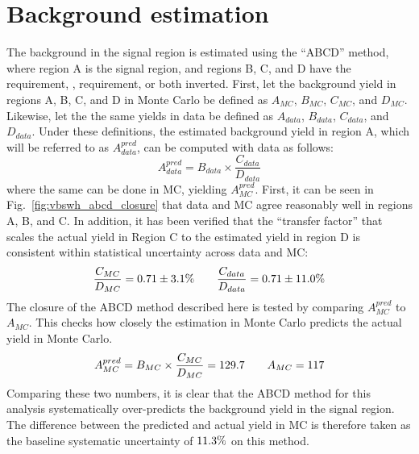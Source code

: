 \section{Background estimation}
The background in the signal region is estimated using the ``ABCD'' method, where region A is the signal region, and regions B, C, and D have the \detajj requirement, \MSD, requirement, or both inverted. %
First, let the background yield in regions A, B, C, and D in Monte Carlo be defined as $A_{MC}$, $B_{MC}$, $C_{MC}$, and $D_{MC}$.
Likewise, let the the same yields in data be defined as  $A_{data}$, $B_{data}$, $C_{data}$, and $D_{data}$.
Under these definitions, the estimated background yield in region A, which will be referred to as $A_{data}^{pred}$, can be computed with data as follows:
\begin{equation}\label{eq:abcd}
    A_{data}^{pred} = B_{data}\times\frac{C_{data}}{D_{data}}
\end{equation}
\noindent where the same can be done in MC, yielding $A_{MC}^{pred}$. 
First, it can be seen in Fig.~\ref{fig:vbswh_abcd_closure} that data and MC agree reasonably well in regions A, B, and C. 
In addition, it has been verified that the ``transfer factor'' that scales the actual yield in Region C to the estimated yield in region D is consistent within statistical uncertainty across data and MC:
\begin{equation*}
    \frac{C_{MC}}{D_{MC}} = 0.71 \pm 3.1\% \qquad \frac{C_{data}}{D_{data}} = 0.71 \pm 11.0\%
\end{equation*}
The closure of the ABCD method described here is tested by comparing $A_{MC}^{pred}$ to $A_{MC}$. 
This checks how closely the estimation in Monte Carlo predicts the actual yield in Monte Carlo. 
\begin{equation*}
    A_{MC}^{pred} = B_{MC}\times\frac{C_{MC}}{D_{MC}} = 129.7 \qquad A_{MC} = 117
\end{equation*}
Comparing these two numbers, it is clear that the ABCD method for this analysis systematically over-predicts the background yield in the signal region. 
The difference between the predicted and actual yield in MC is therefore taken as the baseline systematic uncertainty of $11.3\%$ on this method. 
